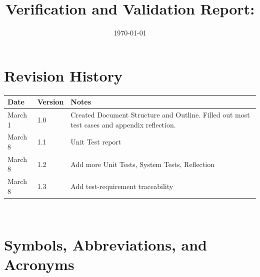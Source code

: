 \documentclass[12pt, titlepage]{article}
\begin{document}
\title{Verification and Validation Report: \progname} 
\author{\authname}
\date{\today}
	
\maketitle


\section{Revision History}

\begin{tabularx}{\textwidth}{p{3cm}p{2cm}X}
  \toprule {\bf Date} & {\bf Version} & {\bf Notes}\\
  \midrule
  March 1 & 1.0 & Created Document Structure and Outline. Filled out most test cases and appendix reflection. \\
  March 8 & 1.1 & Unit Test report\\
  March 8 & 1.2 & Add more Unit Tests, System Tests, Reflection\\
  March 8 & 1.3 & Add test-requirement traceability\\
  \bottomrule
  \end{tabularx}

~\newpage

\section{Symbols, Abbreviations, and Acronyms}
\end{document}
